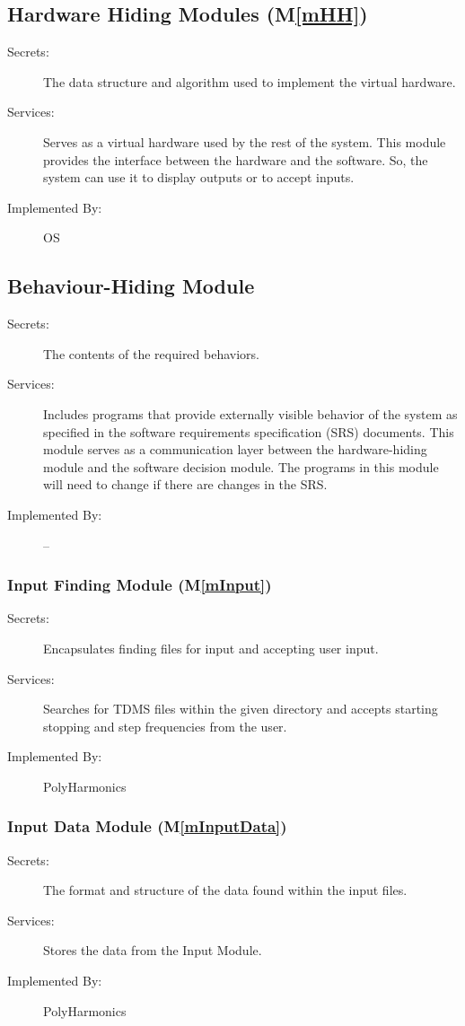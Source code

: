 \documentclass[12pt]{article}
\newcommand{\mref}[1]{M\ref{#1}}
\newcommand{\progname}{PolyHarmonics}
\begin{document}
\subsection{Hardware Hiding Modules (\mref{mHH})}

\begin{description}
\item[Secrets:]The data structure and algorithm used to implement the virtual
  hardware.
\item[Services:]Serves as a virtual hardware used by the rest of the
  system. This module provides the interface between the hardware and the
  software. So, the system can use it to display outputs or to accept inputs.
\item[Implemented By:] OS
\end{description}

\subsection{Behaviour-Hiding Module}

\begin{description}
\item[Secrets:]The contents of the required behaviors.
\item[Services:]Includes programs that provide externally visible behavior of
  the system as specified in the software requirements specification (SRS)
  documents. This module serves as a communication layer between the
  hardware-hiding module and the software decision module. The programs in this
  module will need to change if there are changes in the SRS.
\item[Implemented By:] --
\end{description}

\subsubsection{Input Finding Module  (\mref{mInput})}	
\begin{description}
\item[Secrets:]Encapsulates finding files for input and accepting user input.
\item[Services:]Searches for TDMS files within the given directory and accepts 
starting stopping and step frequencies from the user.
\item[Implemented By:] \progname{}
\end{description}

\subsubsection{Input Data Module  (\mref{mInputData})}
\begin{description}
\item[Secrets:]The format and structure of the data found within the input 
files.
\item[Services:]Stores the data from the Input Module.
\item[Implemented By:] \progname{}
\end{description}
		
\end{document}
